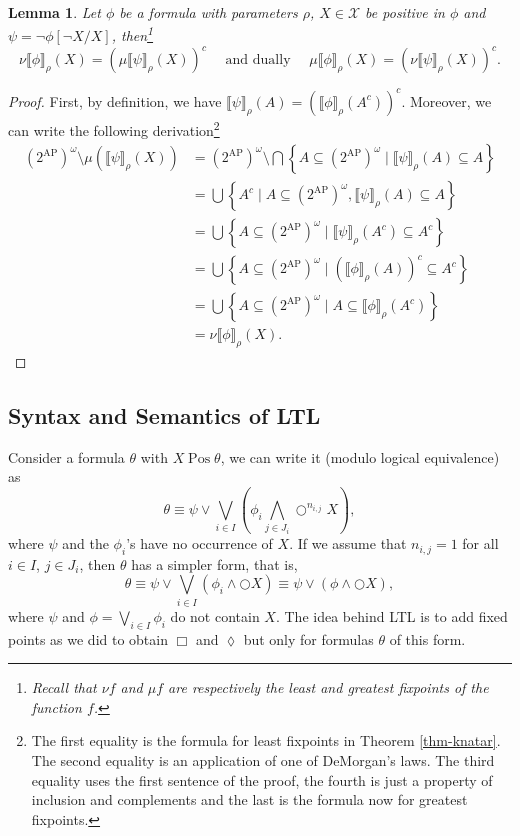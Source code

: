 \documentclass{tufte-handout} %
\newtheorem{lem}[thm]{Lemma}
\theoremstyle{definition}
\theoremstyle{remark}
\newcommand{\bra}[1]{\left(#1\right)}
\newcommand{\0}{\textsf{0}}
\newcommand{\1}{\textsf{1}}
\newcommand{\mX}{\mathcal{X}}
\newcommand{\AP}{\text{AP}}
\newcommand{\sem}[2]{\llbracket #1 \rrbracket_{#2}}
\newcommand{\Pos}{\mathrel{\text{Pos}}}
\begin{document}
\begin{lem}
	Let $\phi$ be a formula with parameters $\rho$, $X\in \mX$ be positive in $\phi$ and $\psi= \neg\phi[\neg X /X]$, then\footnote{Recall that $\nu f$ and $\mu f$ are respectively the least and greatest fixpoints of the function $f$.} \[\nu\sem{\phi}{\rho}(X) =  \bra{\mu\sem{\psi}{\rho}(X)}^c \quad \text{ and dually } \quad \mu\sem{\phi}{\rho}(X) = \bra{\nu\sem{\psi}{\rho}(X)}^c.\]
\end{lem}
\begin{proof}
	First, by definition, we have $\sem{\psi}{\rho}(A) = \bra{\sem{\phi}{\rho}\bra{A^c}}^c$. Moreover, we can write the following derivation\footnote{The first equality is the formula for least fixpoints in Theorem \ref{thm-knatar}. The second equality is an application of one of DeMorgan's laws. The third equality uses the first sentence of the proof, the fourth is just a property of inclusion and complements and the last is the formula now for greatest fixpoints.}
	\begin{align*}
	(2^{\AP})^{\omega} \setminus \mu\bra{\sem{\psi}{\rho}(X)} &= (2^{\AP})^{\omega} \setminus \bigcap \left\{ A \subseteq (2^{\AP})^{\omega} \mid \sem{\psi}{\rho}(A) \subseteq A\right\}\\
	&= \bigcup \left\{ A^c \mid A \subseteq (2^{\AP})^{\omega}, \sem{\psi}{\rho}(A) \subseteq A\right\}\\
	&= \bigcup \left\{ A \subseteq (2^{\AP})^{\omega} \mid  \sem{\psi}{\rho}(A^c) \subseteq A^c\right\}\\
	&= \bigcup \left\{ A \subseteq (2^{\AP})^{\omega} \mid  \bra{\sem{\phi}{\rho}(A)}^c \subseteq A^c\right\}\\
	&= \bigcup \left\{ A \subseteq (2^{\AP})^{\omega} \mid A \subseteq \sem{\phi}{\rho}(A^c)\right\}\\
	&= \nu\sem{\phi}{\rho}(X).
	\end{align*}
\end{proof}

\subsection{Syntax and Semantics of LTL}
Consider a formula $\theta$ with $X \Pos \theta$, we can write it (modulo logical equivalence) as 
\[\theta \equiv \psi \vee \bigvee_{i\in I} (\phi_i \bigwedge_{j \in J_i} \bigcirc^{n_{i,j}} X),\]
where $\psi$ and the $\phi_i$'s have no occurrence of $X$. If we assume that $n_{i,j} = 1$ for all $i \in I$, $j \in J_i$, then $\theta$ has a simpler form, that is,
\[\theta \equiv \psi \vee \bigvee_{i \in I} (\phi_i \wedge \bigcirc X) \equiv \psi \vee (\phi \wedge \bigcirc X),\]
where $\psi$ and $\phi = \bigvee_{i \in I} \phi_i$ do not contain $X$. The idea behind LTL is to add fixed points as we did to obtain $\Box$ and $\lozenge$ but only for formulas $\theta$ of this form.
\end{document}
